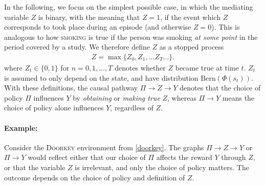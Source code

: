 \documentclass[letterpaper]{article} %
\newcommand{\doorkey}{\textsc{Doorkey}\xspace}
\begin{document}
	In the following, we focus on the simplest possible case, in which the mediating variable $Z$ is binary,  
	with the meaning that $Z=1$, if the event which $Z$ corresponds to took place during an episode (and otherwise $Z=0$). This is analogous to how \textsc{smoking} is true if the person was smoking \emph{at some point} in the period covered by a study. We therefore define $Z$ as a stopped process
	\begin{align}
		Z = \max\{Z_0, Z_1, \dots Z_T\dots\}.
	\end{align}
	where $Z_t \in \{0,1\}$ for $n=0,1,\dots,T$ denotes 
	whether $Z$ became true at time $t$. $Z_t$ is assumed to only depend on the state, and have distribution $\textrm{Bern}\left( \Phi(s_t) \right)$. %
	With these definitions, the causal pathway $\Pi \rightarrow Z \rightarrow Y$ denotes that the choice of policy $\Pi$ influences $Y$ by \emph{obtaining} or \emph{making true} $Z$, whereas $\Pi \rightarrow Y$ means the choice of policy alone influences $Y$, regardless of $Z$. 
	
	\paragraph{Example: }
	Consider the \doorkey environment from \cref{doorkey}. The graphs $\Pi \rightarrow Z \rightarrow Y$ or $\Pi \rightarrow Y$ would reflect either that our choice of $\Pi$ affects the reward $Y$ through $Z$, or that the variable $Z$ is irrelevant, and only the choice of policy matters. The outcome depends on the choice of policy and definition of $Z$. %
	
	
\end{document}
